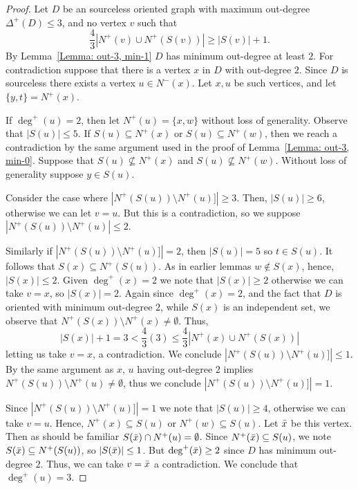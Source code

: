 \documentclass[10pt,a4paper]{amsart}
\begin{document}
\begin{proof}
    Let $D$ be an sourceless oriented graph with maximum out-degree $\Delta^+(D)\leq 3$,
   and no vertex $v$ such that 
    \[
    \frac{4}{3}|N^+(v) \cup N^+(S(v))| \geq |S(v)|+1.
    \]
    By Lemma~\ref{Lemma: out-3, min-1} $D$ has minimum out-degree at least $2$.
    For contradiction suppose that there is a vertex $x$ in $D$ with out-degree $2$.
    Since $D$ is sourceless there exists a vertex $u \in N^-(x)$.
    Let $x,u$ be such vertices, and let $\{y,t\} = N^+(x)$.

    If $\deg^+(u) = 2$, 
    then let $N^+(u) = \{x,w\}$ without loss of generality.
    Observe that $|S(u)|\leq 5$.
    If $S(u) \subseteq N^+(x)$ or $S(u) \subseteq N^+(w)$, then we reach a contradiction by the same argument used in the proof of 
    Lemma~\ref{Lemma: out-3, min-0}.
    Suppose that $S(u) \not\subseteq N^+(x)$ and $S(u) \not\subseteq N^+(w)$.
    Without loss of generality suppose $y \in S(u)$.

    Consider the case where $|N^+(S(u))\setminus N^+(u)]| \geq 3$.
    Then, $|S(u)|\geq 6$, otherwise we can let $v = u$.
    But this is a contradiction, so we suppose $|N^+(S(u))\setminus N^+(u)| \leq 2$.

    Similarly if $|N^+(S(u))\setminus N^+(u)]| = 2$, then $|S(u)| = 5$ so $t \in S(u)$.
    It follows that $S(x)\subseteq N^+(S(u))$.
    As in earlier lemmas $w \notin S(x)$, hence, $|S(x)|\leq 2$.
    Given $\deg^+(x) = 2$ we note that $|S(x)| \geq 2$ otherwise we can take $v =x$, so $|S(x)| = 2$.
    Again since $\deg^+(x) = 2$, and the fact that $D$ is oriented with minimum out-degree $2$, while $S(x)$ is an independent set,
    we observe that $N^+(S(x))\setminus N^+(x) \neq \emptyset$.
    Thus, 
    \[
    |S(x)|+1 = 3 < \frac{4}{3}(3)\leq \frac{4}{3}|N^+(x)\cup N^+(S(x))|
    \]
    letting us take $v = x$, a contradiction.
    We conclude $|N^+(S(u))\setminus N^+(u)]| \leq 1$.
    By the same argument as $x$, $u$ having out-degree $2$ implies $N^+(S(u))\setminus N^+(u) \neq \emptyset$,
    thus we conclude $|N^+(S(u))\setminus N^+(u)]| = 1$.

    Since $|N^+(S(u))\setminus N^+(u)]| = 1$ we note that $|S(u)|\geq 4$, otherwise we can take $v = u$.
    Hence, $N^+(x) \subseteq S(u)$ or $N^+(w) \subseteq S(u)$.
    Let $\Bar{x}$ be this vertex. Then as should be familiar $S(\Bar{x}) \cap N^+(u) = \emptyset$.
    Since $N^+(\Bar{x}) \subseteq S(u)$, we note $S(\Bar{x}) \subseteq N^+(S(u))$,
    so $|S(\Bar{x})|\leq 1$.
    But $\deg^+(\Bar{x})\geq 2$ since $D$ has minimum out-degree $2$.
    Thus, we can take $v = \Bar{x}$ a contradiction.
    We conclude that $\deg^+(u) = 3$.



\end{proof}
\end{document}

